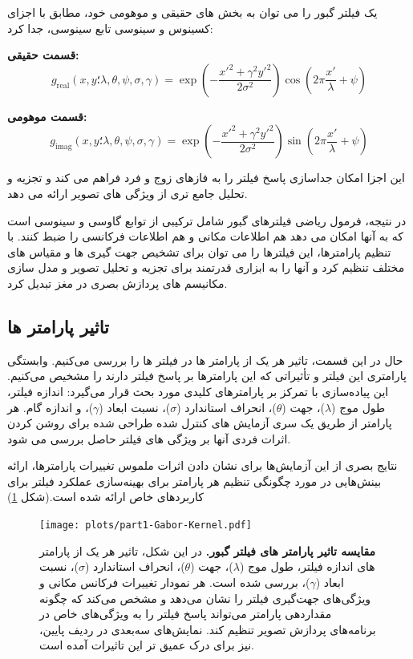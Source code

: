             یک فیلتر گبور را می توان به بخش های حقیقی و موهومی خود، مطابق با اجزای کسینوس و سینوسی تابع سینوسی، جدا کرد:
            
            \textbf{قسمت حقیقی:}
            \[ g_{\text{real}}(x, y؛ \lambda, \theta, \psi, \sigma, \gamma) = \exp \left( -\frac{x'^2 + \gamma^2 y '^2}{2\sigma^2} \right) \cos \left( 2\pi \frac{x'}{\lambda} + \psi \right) \]
            
            \textbf{قسمت موهومی:}
            \[ g_{\text{imag}}(x, y؛ \lambda, \theta, \psi, \sigma, \gamma) = \exp \left( -\frac{x'^2 + \gamma^2 y '^2}{2\sigma^2} \right) \sin \left( 2\pi \frac{x'}{\lambda} + \psi \right) \]
            
            این اجزا امکان جداسازی پاسخ فیلتر را به فازهای زوج و فرد فراهم می کند و تجزیه و تحلیل جامع تری از ویژگی های تصویر ارائه می دهد.
            
            در نتیجه، فرمول ریاضی فیلترهای گبور شامل ترکیبی از توابع گاوسی و سینوسی است که به آنها امکان می دهد هم اطلاعات مکانی و هم اطلاعات فرکانسی را ضبط کنند. با تنظیم پارامترها، این فیلترها را می توان برای تشخیص جهت گیری ها و مقیاس های مختلف تنظیم کرد و آنها را به ابزاری قدرتمند برای تجزیه و تحلیل تصویر و مدل سازی مکانیسم های پردازش بصری در مغز تبدیل کرد.
        \subsection{تاثیر پارامتر ها}
            حال در این قسمت، تاثیر هر یک از پارامتر ها در فیلتر ها را بررسی می‌کنیم. وابستگی پارامتری این فیلتر و تأثیراتی که این پارامترها بر پاسخ فیلتر دارند را مشخیص می‌کنیم. این پیاده‌سازی با تمرکز بر پارامترهای کلیدی مورد بحث قرار می‌گیرد: اندازه فیلتر، طول موج 
            ($\lambda$)، 
            جهت ($\theta$)، 
            انحراف استاندارد ($\sigma$)، 
            نسبت ابعاد ($\gamma$)، 
            و اندازه گام. هر پارامتر از طریق یک سری آزمایش های کنترل شده طراحی شده برای روشن کردن اثرات فردی آنها بر ویژگی های فیلتر حاصل بررسی می شود.

            نتایج بصری از این آزمایش‌ها برای نشان دادن اثرات ملموس تغییرات پارامترها، ارائه بینش‌هایی در مورد چگونگی تنظیم هر پارامتر برای بهینه‌سازی عملکرد فیلتر برای کاربردهای خاص ارائه شده است.(شکل \ref{fig:part1-Gabor-Kernel})
            \begin{figure}[!ht]
                \centering
                \texttt{[image: plots/part1-Gabor-Kernel.pdf]} 
                \captionsetup{width=.9\linewidth}
                \caption{\textbf{مقایسه تاثیر پارامتر های فیلتر گبور.} در این شکل، تاثیر هر یک از پارامتر های 
                اندازه فیلتر، طول موج 
                ($\lambda$)، 
                جهت ($\theta$)، 
                انحراف استاندارد ($\sigma$)، 
                نسبت ابعاد ($\gamma$)، 
                بررسی شده است. 
                هر نمودار تغییرات فرکانس مکانی و ویژگی‌های جهت‌گیری فیلتر را نشان می‌دهد و مشخص می‌کند که چگونه مقداردهی پارامتر می‌تواند پاسخ فیلتر را به ویژگی‌های خاص در برنامه‌های پردازش تصویر تنظیم کند. نمایش‌های سه‌بعدی در ردیف پایین، نیز برای درک عمیق تر این تاثیرات آمده است.}
                \label{fig:part1-Gabor-Kernel}
            \end{figure}


